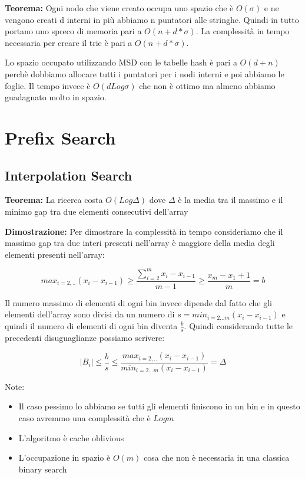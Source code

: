 \documentclass[12pt]{article}
\begin{document}
\textbf{Teorema:} Ogni nodo che viene creato occupa uno spazio che è $O(\sigma)$ e ne vengono creati d interni in più abbiamo n puntatori alle stringhe. Quindi in tutto portano uno spreco di memoria pari a $O(n+d*\sigma)$. La complessità in tempo necessaria per creare il trie è pari a $O(n+d*\sigma)$.

Lo spazio occupato utilizzando MSD con le tabelle hash è pari a $O(d+n)$ perchè dobbiamo allocare tutti i puntatori per i nodi interni e poi abbiamo le foglie.
Il tempo invece è $O(d Log \sigma)$ che non è ottimo ma almeno abbiamo guadagnato molto in spazio.

\newpage

\section{Prefix Search}


\subsection{Interpolation Search}

\textbf{Teorema:} La ricerca costa $O(Log \Delta)$ dove $\Delta$ è la media tra il massimo e il minimo gap tra due elementi consecutivi dell'array

\textbf{Dimostrazione:} Per dimostrare la complessità in tempo consideriamo che il massimo gap tra due interi presenti nell'array è maggiore della media degli elementi presenti nell'array:

\begin{equation}
    max_{i=2,..}(x_i-x_{i-1}) \geq \frac{\sum_{i=2}^m x_i - x_{i-1}}{m-1} \geq \frac{x_m - x_1 + 1}{m} = b
\end{equation}

Il numero massimo di elementi di ogni bin invece dipende dal fatto che gli elementi dell'array sono divisi da un numero di $s= min_{i=2...m}(x_i-x_{i-1})$ e quindi il numero di elementi di ogni bin diventa $\frac{b}{s}$.
Quindi considerando tutte le precedenti disuguaglianze possiamo scrivere:

\begin{equation}
    |B_i| \leq \frac{b}{s} \leq \frac{max_{i=2,..}(x_i-x_{i-1}) }{min_{i=2...m}(x_i-x_{i-1})} = \Delta 
\end{equation}

Note:
\begin{itemize}
\item Il caso pessimo lo abbiamo se tutti gli elementi finiscono in un bin e in questo caso avremmo una complessità che è $Log m$
\item L'algoritmo è cache oblivious
\item L'occupazione in spazio è $O(m)$ cosa che non è necessaria in una classica binary search

\end{itemize}
\end{document}

